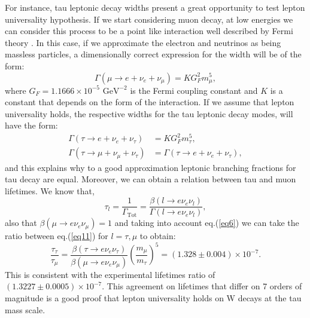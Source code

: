 For instance, tau leptonic decay widths present a great opportunity to test lepton universality hypothesis. If we start considering muon decay, at low energies we can consider this process to be a point like interaction well described by Fermi theory \cite{FermiTheory}. In this case, if we approximate the electron and neutrinos as being massless particles, a dimensionally correct expression for the width will be of the form:
\begin{equation}
	\Gamma(\mu\to e+\nu_e +\nu_\mu)=KG_{F}^{2}m_{\mu}^{5},
\end{equation} 
where $G_F=1.1666\times 10^{-5} \text{ GeV}^{-2}$ is the Fermi coupling constant and $K$ is a constant that depends on the form of the interaction. If we assume that lepton universality holds, the respective widths for the tau leptonic decay modes, will have the form:
\begin{align}
\Gamma(\tau\to e+\nu_e +\nu_\tau)&=KG_{F}^{2}m_{\tau}^{5},
\\
\Gamma(\tau\to \mu+\nu_\mu +\nu_\tau)&=\Gamma(\tau\to e+\nu_e +\nu_\tau),
\end{align}  
and this explains why to a good approximation leptonic branching fractions for tau decay are equal. Moreover, we can obtain a relation between tau and muon lifetimes. We know that,
\begin{equation}
	\tau_l=\frac{1}{\Gamma_\text{Tot}}=\frac{\beta(l\to e\nu_e \nu_l)}{\Gamma(l\to e\nu_e \nu_l)},
	\label{eq11}
\end{equation}
also that $\beta(\mu\to e\nu_e \nu_\mu)=1$ and taking into account eq.(\ref{eq6}) we can take the ratio between eq.(\ref{eq11}) for $l=\tau ,\mu$ to obtain:
\begin{equation}
\frac{\tau_\tau}{\tau_\mu}=\frac{\beta(\tau\to e\nu_e \nu_\tau)}{\beta(\mu\to e\nu_e \nu_\mu)}\left(\frac{m_\mu}{m_\tau}\right)^5=(1.328\pm 0.004)\times 10^{-7}.
\end{equation}
This is consistent with the experimental lifetimes ratio of $(1.3227\pm 0.0005)\times10^{-7}$. This agreement on lifetimes that differ on 7 orders of magnitude is a good proof that lepton universality holds on W decays at the tau mass scale.

